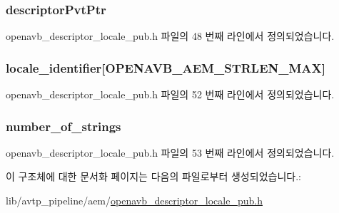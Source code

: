 \subsubsection[{\texorpdfstring{descriptor\+Pvt\+Ptr}{descriptorPvtPtr}}]{ descriptor\+Pvt\+Ptr}\hypertarget{structopenavb__aem__descriptor__locale__t_a302e92fd6cf4d398d5305395359fb157}{}\label{structopenavb__aem__descriptor__locale__t_a302e92fd6cf4d398d5305395359fb157}


openavb\+\_\+descriptor\+\_\+locale\+\_\+pub.\+h 파일의 48 번째 라인에서 정의되었습니다.

\subsubsection[{\texorpdfstring{locale\+\_\+identifier}{locale_identifier}}]{ locale\+\_\+identifier\mbox{[}{\bf O\+P\+E\+N\+A\+V\+B\+\_\+\+A\+E\+M\+\_\+\+S\+T\+R\+L\+E\+N\+\_\+\+M\+AX}\mbox{]}}\hypertarget{structopenavb__aem__descriptor__locale__t_a36cd84f65f57b8d5303c2ba47ecffe81}{}\label{structopenavb__aem__descriptor__locale__t_a36cd84f65f57b8d5303c2ba47ecffe81}


openavb\+\_\+descriptor\+\_\+locale\+\_\+pub.\+h 파일의 52 번째 라인에서 정의되었습니다.

\subsubsection[{\texorpdfstring{number\+\_\+of\+\_\+strings}{number_of_strings}}]{ number\+\_\+of\+\_\+strings}\hypertarget{structopenavb__aem__descriptor__locale__t_ac77cc84484f0e648649ddbb6e993e7e0}{}\label{structopenavb__aem__descriptor__locale__t_ac77cc84484f0e648649ddbb6e993e7e0}


openavb\+\_\+descriptor\+\_\+locale\+\_\+pub.\+h 파일의 53 번째 라인에서 정의되었습니다.



이 구조체에 대한 문서화 페이지는 다음의 파일로부터 생성되었습니다.\+:\begin{DoxyCompactItemize}
\item 
lib/avtp\+\_\+pipeline/aem/\hyperlink{openavb__descriptor__locale__pub_8h}{openavb\+\_\+descriptor\+\_\+locale\+\_\+pub.\+h}\end{DoxyCompactItemize}
